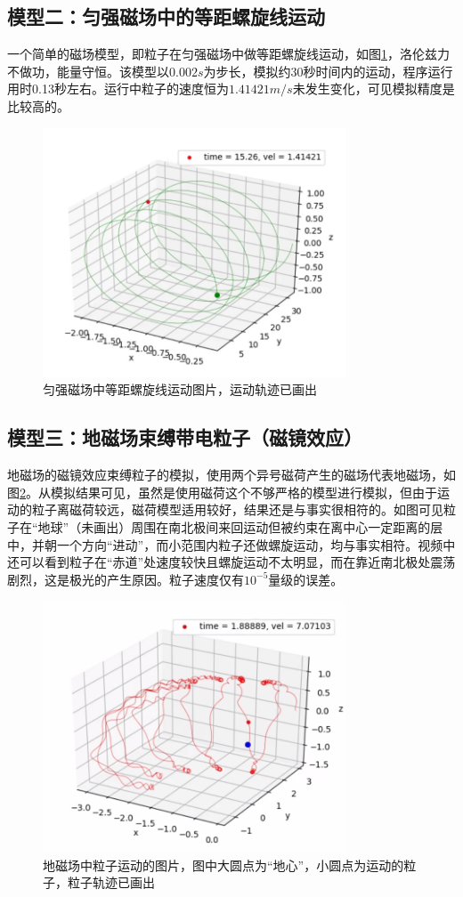\documentclass[UTF-8,cs4size]{ctexart}
\begin{document}
\subsection{模型二：匀强磁场中的等距螺旋线运动}
一个简单的磁场模型，即粒子在匀强磁场中做等距螺旋线运动，如图\ref{fig:helix}，洛伦兹力不做功，能量守恒。该模型以$0.002s$为步长，模拟约30秒时间内的运动，程序运行用时0.13秒左右。运行中粒子的速度恒为$1.41421m/s$未发生变化，可见模拟精度是比较高的。
\begin{figure}[ht!]
	\centering
	\includegraphics[width=9cm]{helix.png}
	\caption{匀强磁场中等距螺旋线运动图片，运动轨迹已画出}
	\label{fig:helix}
\end{figure}
\subsection{模型三：地磁场束缚带电粒子（磁镜效应）}
地磁场的磁镜效应束缚粒子的模拟，使用两个异号磁荷产生的磁场代表地磁场，如图\ref{fig:globe}。从模拟结果可见，虽然是使用磁荷这个不够严格的模型进行模拟，但由于运动的粒子离磁荷较远，磁荷模型适用较好，结果还是与事实很相符的。如图可见粒子在“地球”（未画出）周围在南北极间来回运动但被约束在离中心一定距离的层中，并朝一个方向“进动”，而小范围内粒子还做螺旋运动，均与事实相符。视频中还可以看到粒子在“赤道”处速度较快且螺旋运动不太明显，而在靠近南北极处震荡剧烈，这是极光的产生原因。粒子速度仅有$10^{-5}$量级的误差。
\begin{figure}[ht!]
	\centering
	\includegraphics[width=9cm]{globe.png}
	\caption{地磁场中粒子运动的图片，图中大圆点为“地心”，小圆点为运动的粒子，粒子轨迹已画出}
	\label{fig:globe}
\end{figure}
\end{document}
